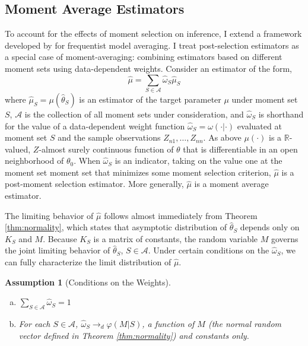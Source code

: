 \documentclass[12pt]{article}
\newtheorem{assump}{Assumption}[section]
\theoremstyle{definition}
\begin{document}
\subsection{Moment Average Estimators}
To account for the effects of moment selection on inference, I extend a framework developed by \cite{HjortClaeskens} for frequentist model averaging. I treat post-selection estimators as a special case of moment-averaging: combining estimators based on different moment sets using data-dependent weights. Consider an estimator of the form,
\begin{equation}
	\label{eq:avg}
	\widehat{\mu}=\sum_{S \in \mathcal{A}} \widehat{\omega}_S\widehat{\mu}_S
\end{equation}
where $\widehat{\mu}_S = \mu(\widehat{\theta}_S)$ is an estimator of the target parameter $\mu$ under moment set $S$, $\mathcal{A}$ is the collection of all moment sets under consideration, and $\widehat{\omega}_S$ is shorthand for the value of a data-dependent weight function  $\widehat{\omega}_S=\omega(\cdot| \cdot)$ evaluated at moment set $S$ and the sample observations $Z_{n1}, \hdots, Z_{nn}$.  As above $\mu(\cdot)$ is a $\mathbb{R}$-valued, $Z$-almost surely continuous function of $\theta$ that is differentiable in an open neighborhood of $\theta_0$. When $\widehat{\omega}_S$ is an indicator, taking on the value one at the moment set moment set that minimizes some moment selection criterion, $\widehat{\mu}$ is a post-moment selection estimator. More generally, $\widehat{\mu}$ is a moment average estimator.

The limiting behavior of $\widehat{\mu}$ follows almost immediately from Theorem \ref{thm:normality}, which states that asymptotic distribution of $\widehat{\theta}_S$ depends only on $K_S$ and $M$. Because $K_S$ is a matrix of constants, the random variable $M$ governs the joint limiting behavior of $\widehat{\theta}_S$, $S\in \mathcal{A}$. Under certain conditions on the $\widehat{\omega}_S$, we can fully characterize the limit distribution of $\widehat{\mu}$.
\begin{assump}[Conditions on the Weights]\mbox{}
\label{assump:weights}
\begin{enumerate}[(a)]
	\item $\sum_{S \in \mathcal{A}} \widehat{\omega}_S = 1$ 
	\item For each $S\in \mathcal{A}$, $\widehat{\omega}_S \rightarrow_d\varphi(M|S)$, a function of $M$ (the normal random vector defined in Theorem \ref{thm:normality}) and constants only.
\end{enumerate}
\end{assump}
\end{document}
